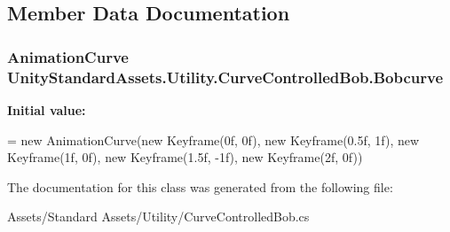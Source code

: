 \subsection{Member Data Documentation}
\subsubsection[{\texorpdfstring{Bobcurve}{Bobcurve}}]{\setlength{\rightskip}{0pt plus 5cm}Animation\+Curve Unity\+Standard\+Assets.\+Utility.\+Curve\+Controlled\+Bob.\+Bobcurve}\hypertarget{class_unity_standard_assets_1_1_utility_1_1_curve_controlled_bob_a11a0684cea298938d69397023f88b0ae}{}\label{class_unity_standard_assets_1_1_utility_1_1_curve_controlled_bob_a11a0684cea298938d69397023f88b0ae}
{\bfseries Initial value\+:}
\begin{DoxyCode}
= \textcolor{keyword}{new} AnimationCurve(\textcolor{keyword}{new} Keyframe(0f, 0f), \textcolor{keyword}{new} Keyframe(0.5f, 1f),
                                                            \textcolor{keyword}{new} Keyframe(1f, 0f), \textcolor{keyword}{new} Keyframe(1.5f, -1f),
                                                            \textcolor{keyword}{new} Keyframe(2f, 0f))
\end{DoxyCode}


The documentation for this class was generated from the following file\+:\begin{DoxyCompactItemize}
\item 
Assets/\+Standard Assets/\+Utility/Curve\+Controlled\+Bob.\+cs\end{DoxyCompactItemize}
